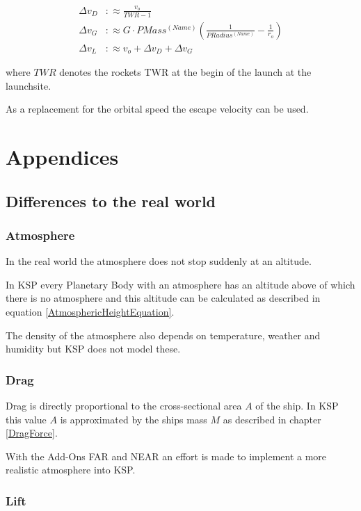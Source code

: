 \documentclass[11pt]{report}
\newcommand{\dv}{{\Delta}{v}}
\begin{document}
\begin{align}
  \dv_D & :\approx \frac{v_o}{TWR-1}\\
  \dv_G & :\approx G\cdot PMass^{(Name)}\left(\frac{1}{PRadius^{(Name)}}-\frac{1}{r_o}\right)\\
  \dv_L & :\approx v_o + \dv_D + \dv_G
\end{align}

where $TWR$ denotes the rockets TWR at the begin of the launch at the
launchsite.

As a replacement for the orbital speed the escape velocity
\cite{EscapeVelocity} can be used.

\part{Appendices}

\chapter{Differences to the real world}\label{RealWorldDifferences}

\section{Atmosphere}

In the real world the atmosphere does not stop suddenly at an
altitude.

In KSP every Planetary Body with an atmosphere has an altitude above
of which there is no atmosphere and this altitude can be calculated as
described in equation \eqref{AtmosphericHeightEquation}.

The density of the atmosphere also depends on temperature, weather and
humidity \cite{RealDensity} but KSP does not model these.

\section{Drag}

Drag is directly proportional to the cross-sectional area $A$ of the
ship.  In KSP this value $A$ is approximated by the ships mass $M$ as
described in chapter \ref{DragForce}.

With the Add-Ons FAR \cite{FAR} and NEAR \cite{NEAR} an effort is made
to implement a more realistic atmosphere into KSP.

\section{Lift}
\end{document}
